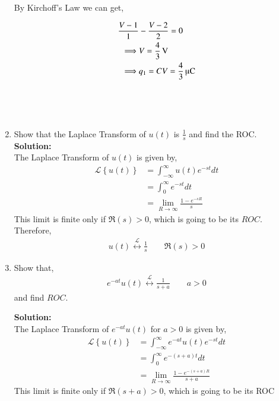 \documentclass[journal,12pt,twocolumn]{IEEEtran}
\newcommand{\solution}{\noindent \textbf{Solution: }}
\providecommand{\cbrak}[1]{\ensuremath{\left\{#1\right\}}}
\providecommand{\system}[1]{\overset{\mathcal{#1}}{ \longleftrightarrow}}
\numberwithin{equation}{section}
\numberwithin{figure}{section}
\renewcommand\thesection{\arabic{section}}
\begin{document}
\begin{enumerate}[label=\thesection.\arabic*.,ref=\thesection.\theenumi]
			By Kirchoff's Law we can get,

			\begin{align}
				\frac{V-1}{1} & - \frac{V-2}{2} = 0\\
				\implies & V = \SI[parse-numbers=false]{\frac{4}{3}}{\volt}\\
				\implies & q_1 = CV = \SI[parse-numbers=false]{\frac{4}{3}}{\micro\coulomb}
			\end{align}\ \\ \ \\ \ \\

		\item Show that the Laplace Transform of $u(t)$ is $\frac{1}{s}$ and find the ROC.\\

		\solution\\
			The Laplace Transform of $u(t)$ is given by,
			\begin{align}
				\mathcal{L}\cbrak{u(t)} & = \int_{-\infty}^\infty u(t) e^{-st} dt \\
							& = \int_0^\infty e^{-st} dt\\
							& = \lim_{R \to \infty} \frac{1-e^{-sR}}{s}
			\end{align}
			This limit is finite only if $\Re(s) > 0$, which is going to be its $ROC$.\\

			Therefore, 
			\begin{align}
				u(t) \system{L} \frac{1}{s} \qquad \Re(s) > 0 
			\end{align}

		\item Show that,
			\begin{align}
				e^{-at}u(t) \system{L} \frac{1}{s+a} \qquad a > 0
			\end{align}
			and find $ROC$.

		\solution\\
			The Laplace Transform of $e^{-at}u(t)$ for $a > 0$ is given by,
			\begin{align}
				\mathcal{L}\cbrak{u(t)} & = \int_{-\infty}^\infty e^{-at} u(t) e^{-st} dt \\
							& = \int_0^\infty e^{-(s+a)t} dt\\
							& = \lim_{R \to \infty} \frac{1-e^{-(s+a)R}}{s+a}
			\end{align}
			This limit is finite only if $\Re(s+a)>0$, which is going to be its ROC


\end{enumerate}
\end{document}
